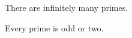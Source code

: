 \documentclass{article}
\begin{document}
\begin{theorem}
There are infinitely many primes.
\end{theorem}
\begin{lemma}
Every prime is odd or two.
\end{lemma}
\end{document}
